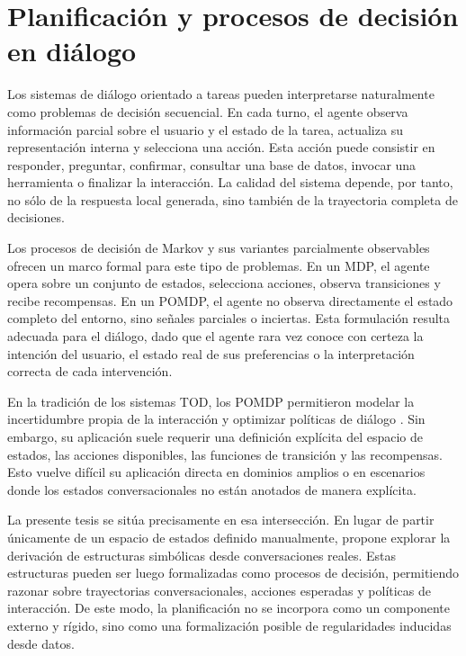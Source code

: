 \section{Planificación y procesos de decisión en diálogo}

Los sistemas de diálogo orientado a tareas pueden interpretarse naturalmente como
problemas de decisión secuencial. En cada turno, el agente observa información parcial
sobre el usuario y el estado de la tarea, actualiza su representación interna y selecciona
una acción. Esta acción puede consistir en responder, preguntar, confirmar, consultar
una base de datos, invocar una herramienta o finalizar la interacción. La calidad del
sistema depende, por tanto, no sólo de la respuesta local generada, sino también de la
trayectoria completa de decisiones.

Los procesos de decisión de Markov y sus variantes parcialmente observables ofrecen
un marco formal para este tipo de problemas. En un \ac{MDP}, el agente opera sobre un
conjunto de estados, selecciona acciones, observa transiciones y recibe recompensas.
En un \ac{POMDP}, el agente no observa directamente el estado completo del entorno,
sino señales parciales o inciertas. Esta formulación resulta adecuada para el diálogo,
dado que el agente rara vez conoce con certeza la intención del usuario, el estado real
de sus preferencias o la interpretación correcta de cada intervención.

En la tradición de los sistemas \ac{TOD}, los \ac{POMDP} permitieron modelar la
incertidumbre propia de la interacción y optimizar políticas de diálogo
\citep{young2010hidden,williams2007pomdp}. Sin embargo, su aplicación suele requerir
una definición explícita del espacio de estados, las acciones disponibles, las funciones
de transición y las recompensas. Esto vuelve difícil su aplicación directa en dominios
amplios o en escenarios donde los estados conversacionales no están anotados de
manera explícita.

La presente tesis se sitúa precisamente en esa intersección. En lugar de partir
únicamente de un espacio de estados definido manualmente, propone explorar la
derivación de estructuras simbólicas desde conversaciones reales. Estas estructuras
pueden ser luego formalizadas como procesos de decisión, permitiendo razonar sobre
trayectorias conversacionales, acciones esperadas y políticas de interacción. De este
modo, la planificación no se incorpora como un componente externo y rígido, sino como
una formalización posible de regularidades inducidas desde datos.

